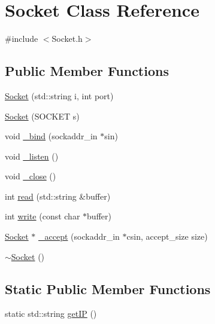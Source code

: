 \hypertarget{classSocket}{}\section{Socket Class Reference}
\label{classSocket}


{\ttfamily \#include $<$Socket.\+h$>$}

\subsection*{Public Member Functions}
\begin{DoxyCompactItemize}
\item 
\mbox{\hyperlink{classSocket_a4c7a40e6c1513edf63e53b74b4f32b80}{Socket}} (std\+::string i, int port)
\item 
\mbox{\hyperlink{classSocket_a7e2193bd6a9b6846f90eaf4786cfc41b}{Socket}} (S\+O\+C\+K\+ET s)
\item 
void \mbox{\hyperlink{classSocket_ab7c6b44800e7a621df9edae86d5fdfa8}{\+\_\+bind}} (sockaddr\+\_\+in $\ast$sin)
\item 
void \mbox{\hyperlink{classSocket_ac54a69178584b414d8137170156ad742}{\+\_\+listen}} ()
\item 
void \mbox{\hyperlink{classSocket_a284f2130a4115a77ebce742427fd0bdb}{\+\_\+close}} ()
\item 
int \mbox{\hyperlink{classSocket_a74fc13f1e87009d84871d73949a664b2}{read}} (std\+::string \&buffer)
\item 
int \mbox{\hyperlink{classSocket_ae2f8cf0b7d27c59600dc5ddf65f8a884}{write}} (const char $\ast$buffer)
\item 
\mbox{\hyperlink{classSocket}{Socket}} $\ast$ \mbox{\hyperlink{classSocket_a153f0c90d33f1d60133b3ab565679013}{\+\_\+accept}} (sockaddr\+\_\+in $\ast$csin, accept\+\_\+size size)
\item 
\mbox{\hyperlink{classSocket_aeac4eb6379a543d38ed88977d3b6630a}{$\sim$\+Socket}} ()
\end{DoxyCompactItemize}
\subsection*{Static Public Member Functions}
\begin{DoxyCompactItemize}
\item 
static std\+::string \mbox{\hyperlink{classSocket_a5f78c7dbb42b062df843a66431acd0de}{get\+IP}} ()
\end{DoxyCompactItemize}


